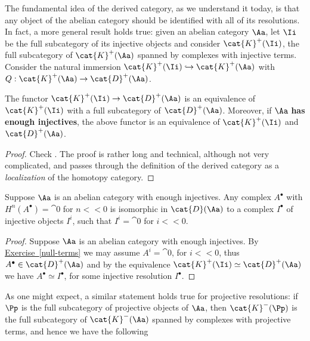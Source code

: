 The fundamental idea of the derived category,
as we understand it today, is that any object
of the abelian category should be identified
with all of its resolutions. 
In fact, a more general result holds true:
given an abelian category $\Aa$,
let $\Ii$ be the full subcategory of its injective objects 
and consider $\cat{K}^{+}(\Ii)$,
the full subcategory of $\cat{K}^{+}(\Aa)$
spanned by complexes with injective terms.
Consider the natural immersion $\cat{K}^{+}(\Ii) \hookrightarrow \cat{K}^{+}(\Aa)$
with $Q : \cat{K}^{+}(\Aa) \to \cat{D}^{+}(\Aa)$.

\begin{thm}\label{inj-equivalence}
    The functor $\cat{K}^{+}(\Ii) \to \cat{D}^{+}(\Aa)$ is an equivalence
    of $\cat{K}^{+}(\Ii)$ with a full subcategory of $\cat{D}^{+}(\Aa)$.
    Moreover, if $\Aa$ \textbf{has enough injectives}, the above functor
    is an equivalence of $\cat{K}^{+}(\Ii)$ and $\cat{D}^{+}(\Aa)$.
    \begin{proof}
        Check \parencite[III.5.20]{gelfand}.
        The proof is rather long and technical,
        although not very complicated,
        and passes through the definition of the
        derived category as a \emph{localization}
        of the homotopy category.
    \end{proof}
\end{thm}

\begin{cor}
    Suppose $\Aa$ is an abelian category with enough injectives.
    Any complex $A^{\bullet}$ with 
    $H^{n}(A^{\bullet}) = \cat{0}$ for $n<<0$
    is isomorphic in $\cat{D}(\Aa)$ to a complex
    $I^{\bullet}$ of injective objects $I^{i}$,
    such that $I^{i}=\cat{0}$ for $i << 0$.
    \begin{proof}
        Suppose $\Aa$ is an abelian category with enough injectives.
        By \hyperref[null-terms]{Exercise~\ref*{null-terms}}
        we may assume $A^{i} = \cat{0}$, for $i << 0$,
        thus $A^{\bullet} \in \cat{D}^{+}(\Aa)$
        and by the equivalence $\cat{K}^{+}(\Ii) \simeq \cat{D}^{+}(\Aa)$
        we have $A^{\bullet} \simeq I^{\bullet}$,
        for some injective resolution $I^{\bullet}$.
    \end{proof}
\end{cor}

As one might expect, a similar statement holds true for
projective resolutions: if $\Pp$ is the full subcategory 
of projective objects of $\Aa$, then $\cat{K}^{-}(\Pp)$
is the full subcategory of $\cat{K}^{-}(\Aa)$ spanned by
complexes with projective terms, and hence we have the following

